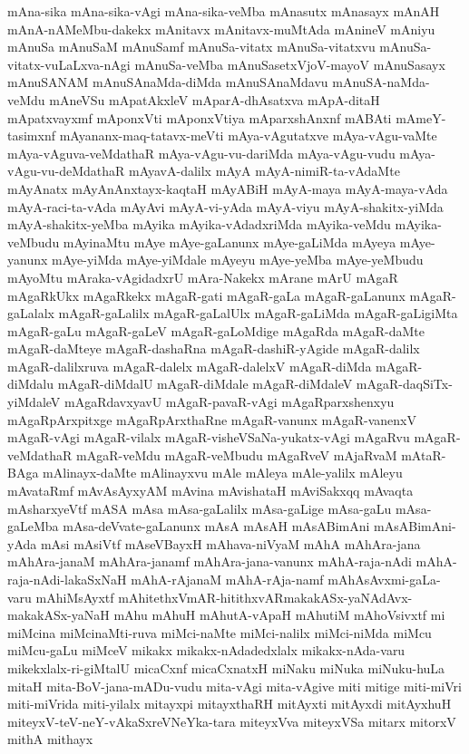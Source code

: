 {mAna-sika
mAna-sika-vAgi
mAna-sika-veMba
mAnasutx
mAnasayx
mAnAH
mAnA-nAMeMbu-dakekx
mAnitavx
mAnitavx-muMtAda
mAnineV
mAniyu
mAnuSa
mAnuSaM
mAnuSamf
mAnuSa-vitatx
mAnuSa-vitatxvu
mAnuSa-vitatx-vuLaLxva-nAgi
mAnuSa-veMba
mAnuSasetxVjoV-mayoV
mAnuSasayx
mAnuSANAM
mAnuSAnaMda-diMda
mAnuSAnaMdavu
mAnuSA-naMda-veMdu
mAneVSu
mApatAkxleV
mAparA-dhAsatxva
mApA-ditaH
mApatxvayxmf
mAponxVti
mAponxVtiya
mAparxshAnxnf
mABAti
mAmeY-tasimxnf
mAyananx-maq-tatavx-meVti
mAya-vAgutatxve
mAya-vAgu-vaMte
mAya-vAguva-veMdathaR
mAya-vAgu-vu-dariMda
mAya-vAgu-vudu
mAya-vAgu-vu-deMdathaR
mAyavA-dalilx
mAyA
mAyA-nimiR-ta-vAdaMte
mAyAnatx
mAyAnAnxtayx-kaqtaH
mAyABiH
mAyA-maya
mAyA-maya-vAda
mAyA-raci-ta-vAda
mAyAvi
mAyA-vi-yAda
mAyA-viyu
mAyA-shakitx-yiMda
mAyA-shakitx-yeMba
mAyika
mAyika-vAdadxriMda
mAyika-veMdu
mAyika-veMbudu
mAyinaMtu
mAye
mAye-gaLanunx
mAye-gaLiMda
mAyeya
mAye-yanunx
mAye-yiMda
mAye-yiMdale
mAyeyu
mAye-yeMba
mAye-yeMbudu
mAyoMtu
mAraka-vAgidadxrU
mAra-Nakekx
mArane
mArU
mAgaR
mAgaRkUkx
mAgaRkekx
mAgaR-gati
mAgaR-gaLa
mAgaR-gaLanunx
mAgaR-gaLalalx
mAgaR-gaLalilx
mAgaR-gaLalUlx
mAgaR-gaLiMda
mAgaR-gaLigiMta
mAgaR-gaLu
mAgaR-gaLeV
mAgaR-gaLoMdige
mAgaRda
mAgaR-daMte
mAgaR-daMteye
mAgaR-dashaRna
mAgaR-dashiR-yAgide
mAgaR-dalilx
mAgaR-dalilxruva
mAgaR-dalelx
mAgaR-dalelxV
mAgaR-diMda
mAgaR-diMdalu
mAgaR-diMdalU
mAgaR-diMdale
mAgaR-diMdaleV
mAgaR-daqSiTx-yiMdaleV
mAgaRdavxyavU
mAgaR-pavaR-vAgi
mAgaRparxshenxyu
mAgaRpArxpitxge
mAgaRpArxthaRne
mAgaR-vanunx
mAgaR-vanenxV
mAgaR-vAgi
mAgaR-vilalx
mAgaR-visheVSaNa-yukatx-vAgi
mAgaRvu
mAgaR-veMdathaR
mAgaR-veMdu
mAgaR-veMbudu
mAgaRveV
mAjaRvaM
mAtaR-BAga
mAlinayx-daMte
mAlinayxvu
mAle
mAleya
mAle-yalilx
mAleyu
mAvataRmf
mAvAsAyxyAM
mAvina
mAvishataH
mAviSakxqq
mAvaqta
mAsharxyeVtf
mASA
mAsa
mAsa-gaLalilx
mAsa-gaLige
mAsa-gaLu
mAsa-gaLeMba
mAsa-deVvate-gaLanunx
mAsA
mAsAH
mAsABimAni
mAsABimAni-yAda
mAsi
mAsiVtf
mAseVBayxH
mAhava-niVyaM
mAhA
mAhAra-jana
mAhAra-janaM
mAhAra-janamf
mAhAra-jana-vanunx
mAhA-raja-nAdi
mAhA-raja-nAdi-lakaSxNaH
mAhA-rAjanaM
mAhA-rAja-namf
mAhAsAvxmi-gaLa-varu
mAhiMsAyxtf
mAhitethxVmAR-hitithxvARmakakASx-yaNAdAvx-makakASx-yaNaH
mAhu
mAhuH
mAhutA-vApaH
mAhutiM
mAhoVsivxtf
mi
miMcina
miMcinaMti-ruva
miMci-naMte
miMci-nalilx
miMci-niMda
miMcu
miMcu-gaLu
miMceV
mikakx
mikakx-nAdadedxlalx
mikakx-nAda-varu
mikekxlalx-ri-giMtalU
micaCxnf
micaCxnatxH
miNaku
miNuka
miNuku-huLa
mitaH
mita-BoV-jana-mADu-vudu
mita-vAgi
mita-vAgive
miti
mitige
miti-miVri
miti-miVrida
miti-yilalx
mitayxpi
mitayxthaRH
mitAyxti
mitAyxdi
mitAyxhuH
miteyxV-teV-neY-vAkaSxreVNeYka-tara
miteyxVva
miteyxVSa
mitarx
mitorxV
mithA
mithayx
}
